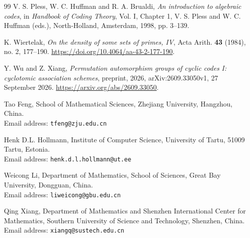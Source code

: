\documentclass[11pt]{article}
\begin{document}
\begin{thebibliography}{99}
V. S. Pless, W. C. Huffman and R. A. Brualdi,
\emph{An introduction to algebraic codes}, in
\emph{Handbook of Coding Theory}, Vol. I, Chapter 1,
V. S. Pless and W. C. Huffman (eds.), North-Holland, Amsterdam,
1998, pp. 3--139.


K. Wiertelak, \emph{On the density of some sets of primes, IV},
Acta Arith. \textbf{43} (1984), no. 2, 177--190.
\url{https://doi.org/10.4064/aa-43-2-177-190}.

Y. Wu and Z. Xiang, \emph{Permutation automorphism groups of cyclic
codes I: cyclotomic association schemes}, preprint, 2026,
arXiv:2609.33050v1, 27 September 2026.
\url{https://arxiv.org/abs/2609.33050}.
\end{thebibliography}
\bigskip
\begingroup\small
\noindent Tao Feng, School of Mathematical Sciences, Zhejiang University,
Hangzhou, China.\\
Email address: \texttt{tfeng@zju.edu.cn}

\medskip\noindent Henk D.L. Hollmann, Institute of Computer Science,
University of Tartu, 51009 Tartu, Estonia.\\
Email address: \texttt{henk.d.l.hollmann@ut.ee}

\medskip\noindent Weicong Li, Department of Mathematics, School of Sciences,
Great Bay University, Dongguan, China.\\
Email address: \texttt{liweicong@gbu.edu.cn}

\medskip\noindent Qing Xiang, Department of Mathematics and Shenzhen
International Center for Mathematics, Southern University of Science
and Technology, Shenzhen, China.\\
Email address: \texttt{xiangq@sustech.edu.cn}
\endgroup
\end{document}
